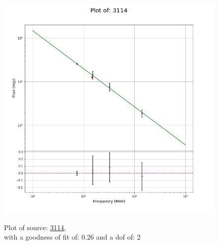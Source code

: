 \documentclass{article}
\begin{document}
\begin{figure}[H]
\begin{minipage}{0.5\textwidth}
        \includegraphics[scale = 0.35]{KmeulenTrap4P23_1hr/1hr3114.png}
        \captionsetup{labelformat=empty}
        \caption{Plot of source: \href{http://banana.transientskp.org/r4/vlo_KmeulenTrap4P23/runningcatalog/3114}{3114},\\with a goodness of fit of: 0.26 and a dof of: 2}
    \addtocounter{figure}{-1}
    \label{KmeulenTrap4P23:1hr:3114:plot}
    \end{minipage}
\end{figure}
\end{document}
